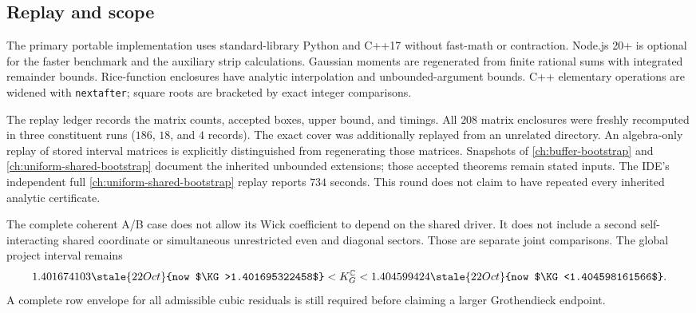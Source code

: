 \subsection{Replay and scope}
The primary portable implementation uses standard-library Python and
C++17 without fast-math or contraction. Node.js 20+ is optional for
the faster benchmark and the auxiliary strip calculations.
Gaussian moments are regenerated from finite rational sums
with integrated remainder bounds. Rice-function enclosures have
analytic interpolation and unbounded-argument bounds. C++ elementary
operations are widened with \texttt{nextafter}; square roots are
bracketed by exact integer comparisons.

The replay ledger records the matrix counts, accepted boxes,
upper bound, and timings. All $208$ matrix enclosures were freshly
recomputed in three constituent runs ($186$, $18$, and $4$ records).
The exact cover was additionally replayed from an unrelated directory.
An algebra-only replay of stored interval
matrices is explicitly distinguished from regenerating those matrices.
Snapshots of \autoref{ch:buffer-bootstrap} and \autoref{ch:uniform-shared-bootstrap} document the inherited unbounded
extensions; those accepted theorems remain stated inputs. The IDE's
independent full \autoref{ch:uniform-shared-bootstrap} replay reports $734$ seconds. This round
does not claim to have repeated every inherited analytic certificate.

The complete coherent A/B case does not allow its Wick coefficient
to depend on the shared driver. It does not include a second
self-interacting shared coordinate or simultaneous unrestricted
even and diagonal sectors. Those are separate joint comparisons.
The global project interval remains
\[
 1.401674103\stale{22 Oct}{now $\KG>1.401695322458$}<K_G^{\mathbb C}<1.404599424\stale{22 Oct}{now $\KG<1.404598161566$}.
\]
A complete row envelope for all admissible cubic residuals is still
required before claiming a larger Grothendieck endpoint.



